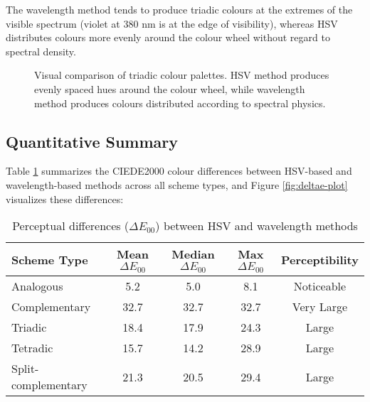 \documentclass[12pt,a4paper]{article}
\newcommand{\deltaE}{\Delta E_{00}}
\begin{document}
The wavelength method tends to produce triadic colours at the extremes of the visible spectrum (violet at 380 nm is at the edge of visibility), whereas HSV distributes colours more evenly around the colour wheel without regard to spectral density.

\begin{figure}[H]
\centering
{}
\caption{Visual comparison of triadic colour palettes. HSV method produces evenly spaced hues around the colour wheel, while wavelength method produces colours distributed according to spectral physics.}
\label{fig:triadic-comparison}
\end{figure}

\subsection{Quantitative Summary}

Table \ref{tab:deltae-summary} summarizes the CIEDE2000 colour differences between HSV-based and wavelength-based methods across all scheme types, and Figure \ref{fig:deltae-plot} visualizes these differences:

\begin{table}[ht]
\centering
\caption{Perceptual differences ($\deltaE$) between HSV and wavelength methods}
\label{tab:deltae-summary}
\begin{tabular}{lcccc}
\toprule
\textbf{Scheme Type} & \textbf{Mean $\deltaE$} & \textbf{Median $\deltaE$} & \textbf{Max $\deltaE$} & \textbf{Perceptibility} \\
\midrule
Analogous & 5.2 & 5.0 & 8.1 & Noticeable \\
Complementary & 32.7 & 32.7 & 32.7 & Very Large \\
Triadic & 18.4 & 17.9 & 24.3 & Large \\
Tetradic & 15.7 & 14.2 & 28.9 & Large \\
Split-complementary & 21.3 & 20.5 & 29.4 & Large \\
\bottomrule
\end{tabular}
\end{table}
\end{document}
